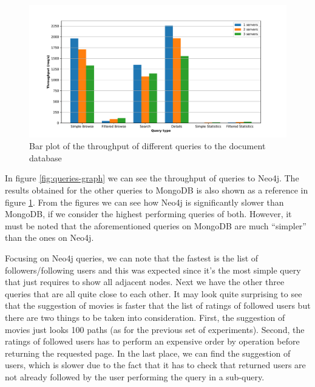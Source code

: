 \documentclass[11pt]{article}
\begin{document}
\begin{figure}[]
    \centering
    \includegraphics[width=\textwidth]{figs/siege_barplot_all.pdf}
    \caption{Bar plot of the throughput of different queries to the document database}
    \label{fig:queries-mongo}
\end{figure}

In figure \ref{fig:queries-graph} we can see the throughput of queries to Neo4j.
The results obtained for the other queries to MongoDB is also shown as a
reference in figure \ref{fig:queries-mongo}. From the figures we can see how 
Neo4j is significantly slower than MongoDB, if we consider the highest 
performing queries of both. However, it must be noted that the aforementioned
queries on MongoDB are much ``simpler'' than the ones on Neo4j.

Focusing on Neo4j queries, we can note that the fastest is the list of 
followers/following users and this was expected since it's the most simple 
query that just requires to show all adjacent nodes. Next we have the 
other three queries that are all quite close to each other. It may look quite
surprising to see that the suggestion of movies is faster that the list of 
ratings of followed users but there are two things to be taken into 
consideration. First, the suggestion of movies just looks 100 paths (as for 
the previous set of experiments). Second, the ratings of followed users has 
to perform an expensive order by operation before returning the requested page.
In the last place, we can find the suggestion of users, which is slower due to 
the fact that it has to check that returned users are not already followed by 
the user performing the query in a sub-query.
\end{document}
